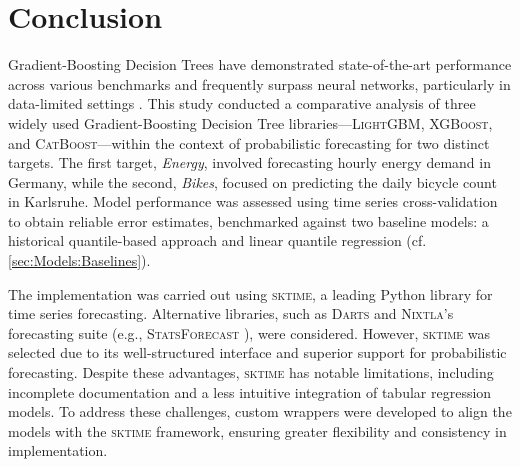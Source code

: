 \newpage
\section{Conclusion}
\label{ch:Conclusion}

Gradient-Boosting Decision Trees have demonstrated state-of-the-art performance across various benchmarks and frequently surpass neural networks, particularly in data-limited settings \parencites{shwartz-ziv_tabular_2021, grinsztajn_why_2022}. This study conducted a comparative analysis of three widely used Gradient-Boosting Decision Tree libraries—\textsc{LightGBM}, \textsc{XGBoost}, and \textsc{CatBoost}—within the context of probabilistic forecasting for two distinct targets. The first target, \textit{Energy}, involved forecasting hourly energy demand in Germany, while the second, \textit{Bikes}, focused on predicting the daily bicycle count in Karlsruhe. Model performance was assessed using time series cross-validation to obtain reliable error estimates, benchmarked against two baseline models: a historical quantile-based approach and linear quantile regression (cf. \cref{sec:Models:Baselines}).

The implementation was carried out using \textsc{sktime}, a leading Python library for time series forecasting. Alternative libraries, such as \textsc{Darts} \parencite{herzen_darts_2022} and \textsc{Nixtla}’s forecasting suite (e.g., \textsc{StatsForecast} \parencite{azul_garza_statsforecast_2022}), were considered. However, \textsc{sktime} was selected due to its well-structured interface and superior support for probabilistic forecasting. Despite these advantages, \textsc{sktime} has notable limitations, including incomplete documentation and a less intuitive integration of tabular regression models. To address these challenges, custom wrappers were developed to align the models with the \textsc{sktime} framework, ensuring greater flexibility and consistency in implementation.

